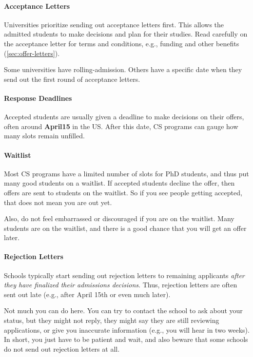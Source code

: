 \documentclass[oneside,11pt]{book}
\begin{document}
\paragraph{Acceptance Letters} Universities prioritize sending out acceptance letters first. This allows the admitted students to make decisions and plan for their studies. Read carefully on the acceptance letter for terms and conditions, e.g., funding and other benefits (\autoref{sec:offer-letters}).

Some universities have \gls{rolling-admission}. Others have a specific date when they send out the first round of acceptance letters.   

\paragraph{Response Deadlines} Accepted students are usually given a deadline to make decisions on their offers, often around \textbf{\Gls{April15}} in the US. After this date, CS programs can gauge how many slots remain unfilled.

\paragraph{Waitlist} Most CS programs have a limited number of slots for PhD students, and thus put many good students on a waitlist.  If accepted students decline the offer, then offers are sent to students on the waitlist. So if you see people getting accepted, that does not mean you are out yet. 



Also, do not feel embarrassed or discouraged if you are on the waitlist. Many students are on the waitlist, and there is a good chance that you will get an offer later.

\paragraph{Rejection Letters} Schools typically start sending out rejection letters to remaining applicants \emph{after they have finalized their admissions decisions}. Thus, rejection letters are often sent out late (e.g., after April 15th or even much later). 

Not much you can do here. You can try to contact the school to ask about your status, but they might not reply, they might say they are still reviewing applications, or give you inaccurate information (e.g., you will hear in two weeks). In short, you just have to be patient and wait, and also beware that some schools do not send out rejection letters at all.
\end{document}
